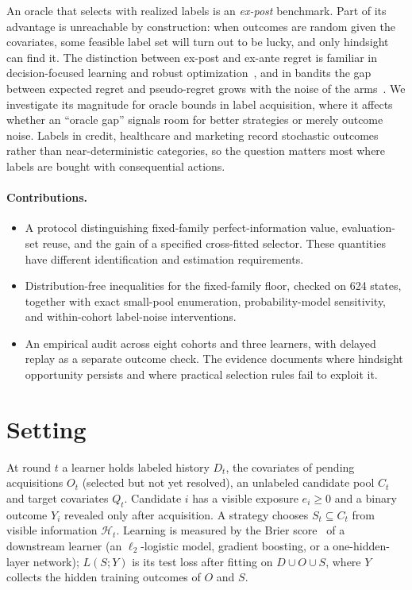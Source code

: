 \documentclass[runningheads]{llncs}
\begin{document}
An oracle that selects with realized labels is an \emph{ex-post} benchmark. Part of its advantage is unreachable by construction: when outcomes are random given the covariates, some feasible label set will turn out to be lucky, and only hindsight can find it. The distinction between ex-post and ex-ante regret is familiar in decision-focused learning and robust optimization~\cite{schutte2023robust}, and in bandits the gap between expected regret and pseudo-regret grows with the noise of the arms~\cite{bubeck2012regret,audibert2010regret}. We investigate its magnitude for oracle bounds in label acquisition, where it affects whether an ``oracle gap'' signals room for better strategies or merely outcome noise. Labels in credit, healthcare and marketing record stochastic outcomes rather than near-deterministic categories, so the question matters most where labels are bought with consequential actions.

\paragraph{Contributions.}
\begin{itemize}
\item A protocol distinguishing fixed-family perfect-information value, evaluation-set reuse, and the gain of a specified cross-fitted selector. These quantities have different identification and estimation requirements.
\item Distribution-free inequalities for the fixed-family floor, checked on 624 states, together with exact small-pool enumeration, probability-model sensitivity, and within-cohort label-noise interventions.
\item An empirical audit across eight cohorts and three learners, with delayed replay as a separate outcome check. The evidence documents where hindsight opportunity persists and where practical selection rules fail to exploit it.
\end{itemize}



\section{Setting}
\label{sec:setting}
At round $t$ a learner holds labeled history $D_t$, the covariates of pending acquisitions $O_t$ (selected but not yet resolved), an unlabeled candidate pool $C_t$ and target covariates $Q_t$. Candidate $i$ has a visible exposure $e_i\ge0$ and a binary outcome $Y_i$ revealed only after acquisition. A strategy chooses $S_t\subseteq C_t$ from visible information $\mathcal H_t$. Learning is measured by the Brier score~\cite{brier1950verification} of a downstream learner (an $\ell_2$-logistic model, gradient boosting, or a one-hidden-layer network); $L(S;Y)$ is its test loss after fitting on $D\cup O\cup S$, where $Y$ collects the hidden training outcomes of $O$ and $S$.
\end{document}
